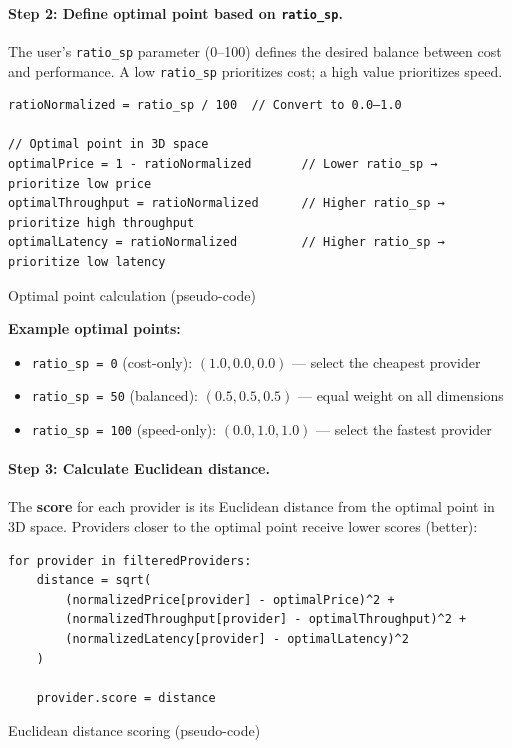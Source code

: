 \documentclass[english]{article}
\begin{document}
\paragraph{Step 2: Define optimal point based on \texttt{ratio\_sp}.}

The user's \texttt{ratio\_sp} parameter (0–100) defines the desired balance between cost and performance. A low \texttt{ratio\_sp} prioritizes cost; a high value prioritizes speed.

\begin{listing}[H]
\begin{verbatim}
ratioNormalized = ratio_sp / 100  // Convert to 0.0–1.0

// Optimal point in 3D space
optimalPrice = 1 - ratioNormalized       // Lower ratio_sp → prioritize low price
optimalThroughput = ratioNormalized      // Higher ratio_sp → prioritize high throughput
optimalLatency = ratioNormalized         // Higher ratio_sp → prioritize low latency
\end{verbatim}
\caption{Optimal point calculation (pseudo-code)}
\end{listing}

\textbf{Example optimal points:}
\begin{itemize}
    \item \texttt{ratio\_sp = 0} (cost-only): $(1.0, 0.0, 0.0)$ — select the cheapest provider
    \item \texttt{ratio\_sp = 50} (balanced): $(0.5, 0.5, 0.5)$ — equal weight on all dimensions
    \item \texttt{ratio\_sp = 100} (speed-only): $(0.0, 1.0, 1.0)$ — select the fastest provider
\end{itemize}

\paragraph{Step 3: Calculate Euclidean distance.}

The \textbf{score} for each provider is its Euclidean distance from the optimal point in 3D space. Providers closer to the optimal point receive lower scores (better):

\begin{listing}[H]
\begin{verbatim}
for provider in filteredProviders:
    distance = sqrt(
        (normalizedPrice[provider] - optimalPrice)^2 +
        (normalizedThroughput[provider] - optimalThroughput)^2 +
        (normalizedLatency[provider] - optimalLatency)^2
    )

    provider.score = distance
\end{verbatim}
\caption{Euclidean distance scoring (pseudo-code)}
\end{listing}
\end{document}

